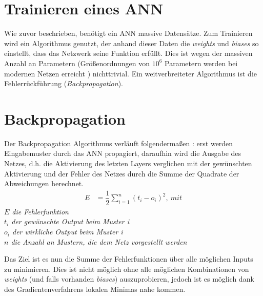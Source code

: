 \documentclass{thesisclass}
\begin{document}
\section{Trainieren eines \gls{ANN}}
Wie zuvor beschrieben, benötigt ein \gls{ANN} massive Datensätze. Zum Trainieren wird ein Algorithmus genutzt, der anhand dieser Daten die \textit{weights} und \textit{biases} so einstellt, dass das Netzwerk seine Funktion erfüllt. Dies ist wegen der massiven Anzahl an Parametern (Größenordnungen von $10^{6}$ Parametern werden bei modernen Netzen erreicht \cite{szegedy2015going}) nichttrivial. Ein weitverbreiteter Algorithmus ist die Fehlerrückführung (\textit{Backpropagation}).

\section{Backpropagation}
Der Backpropagation Algorithmus verläuft folgendermaßen \cite{BibEntry2019Jan}: erst werden Eingabemuster durch das \gls{ANN} propagiert, daraufhin wird die Ausgabe des Netzes, d.h. die Aktivierung des letzten Layers verglichen mit der gewünschten Aktivierung und der Fehler des Netzes durch die Summe der Quadrate der Abweichungen berechnet.
\begin{align*}
E &= \dfrac{1}{2}{\sum_{i=1}^{n}(t_i - o_i)^2},\ mit
\end{align*}
\textit{$E$ die Fehlerfunktion} \\
\textit{$t_i$ der gewünschte Output beim Muster i} \\
\textit{$o_i$ der wirkliche Output beim Muster i} \\
\textit{$n$ die Anzahl an Mustern, die dem Netz vorgestellt werden}

Das Ziel ist es nun die Summe der Fehlerfunktionen über alle möglichen Inputs zu minimieren. Dies ist nicht möglich ohne alle möglichen Kombinationen von \textit{weights} (und falls vorhanden \textit{biases}) auszuprobieren, jedoch ist es möglich dank des Gradientenverfahrens lokalen Minimas nahe kommen.
\end{document}
